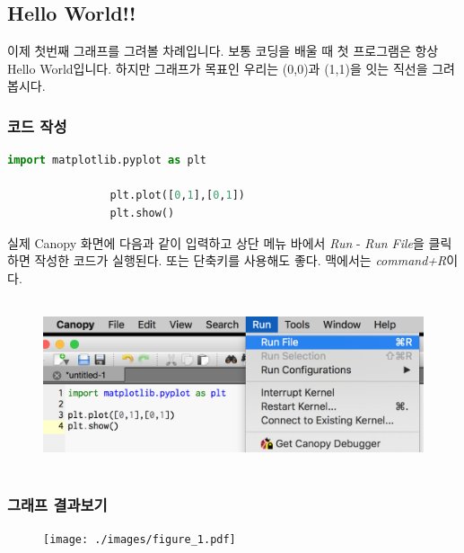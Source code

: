 \documentclass[12pt]{article}
\begin{document}
		\subsection{Hello World!!}
			이제 첫번째 그래프를 그려볼 차례입니다. 보통 코딩을 배울 때 첫 프로그램은 항상 Hello World입니다. 하지만 그래프가 목표인 우리는 (0,0)과 (1,1)을 잇는 직선을 그려봅시다.\newline
			\subsubsection{코드 작성}
				\begin{lstlisting}[style=pstyle, language=Python, caption=first graph]
				import matplotlib.pyplot as plt
				
				plt.plot([0,1],[0,1])
				plt.show()\end{lstlisting}
				실제 Canopy 화면에 다음과 같이 입력하고 상단 메뉴 바에서 \textit{Run} - \textit{Run File}을 클릭하면 작성한 코드가 실행된다. 또는 단축키를 사용해도 좋다. 맥에서는 \textit{command+R}이다.
				\begin{figure}[h]
					\begin{center}
						\includegraphics[height=5cm]{./images/2_2_c.png}
					\end{center}
				\end{figure}
			
			\clearpage
			\subsubsection{그래프 결과보기}
				\begin{figure}[h]
					\begin{center}
						\texttt{[image: ./images/figure\_1.pdf]}
					\end{center}
				\end{figure}
				
\end{document}
